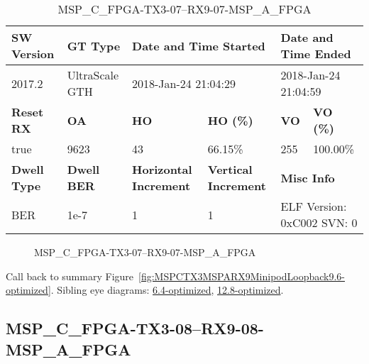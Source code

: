 \begin{table}[h]
\centering
\caption{MSP\_C\_FPGA-TX3-07--RX9-07-MSP\_A\_FPGA}
\label{tab:MSPCFPGATX307RX907MSPAFPGA9.6-optimized}
\begin{tabular}{@{}|l|l|l|l|l|l|@{}}
\toprule
\textbf{SW Version}                & \textbf{GT Type}   & \multicolumn{2}{l|}{\textbf{Date and Time Started}}            & \multicolumn{2}{l|}{\textbf{Date and Time Ended}}        \\ \midrule
2017.2                       & UltraScale GTH          & \multicolumn{2}{l|}{2018-Jan-24 21:04:29}                   & \multicolumn{2}{l|}{2018-Jan-24 21:04:59}               \\ \midrule
\textbf{Reset RX}                  & \textbf{OA} & \textbf{HO}   & \textbf{HO (\%)} & \textbf{VO} & \textbf{VO (\%)} \\ \midrule
true & 9623        & 43          & 66.15\%        & 255        & 100.00\%       \\ \midrule
\textbf{Dwell Type}                & \textbf{Dwell BER} & \textbf{Horizontal Increment} & \textbf{Vertical Increment}    & \multicolumn{2}{l|}{\textbf{Misc Info}}                  \\ \midrule
BER                            & 1e-7        & 1        & 1           & \multicolumn{2}{l|}{ELF Version: 0xC002 SVN: 0}                         \\ \bottomrule
\end{tabular}
\end{table}

\begin{figure}[h]
\caption{MSP\_C\_FPGA-TX3-07--RX9-07-MSP\_A\_FPGA} \label{fig:MSPCFPGATX307RX907MSPAFPGA9.6-optimized}
\end{figure}

Call back to summary Figure~\ref{fig:MSPCTX3MSPARX9MinipodLoopback9.6-optimized}.
Sibling eye diagrams: \hyperref[sec:MSPCFPGATX307RX907MSPAFPGA6.4-optimized]{6.4-optimized}, \hyperref[sec:MSPCFPGATX307RX907MSPAFPGA12.8-optimized]{12.8-optimized}.

\clearpage
\newpage


\subsection{MSP\_C\_FPGA-TX3-08--RX9-08-MSP\_A\_FPGA}\label{sec:MSPCFPGATX308RX908MSPAFPGA9.6-optimized}

